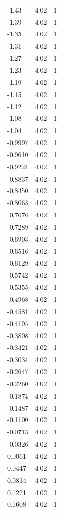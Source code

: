 \begin{longtable}{lrr}
  -1.43 & 4.02 & 1 \\
  -1.39 & 4.02 & 1 \\
  -1.35 & 4.02 & 1 \\
  -1.31 & 4.02 & 1 \\
  -1.27 & 4.02 & 1 \\
  -1.23 & 4.02 & 1 \\
  -1.19 & 4.02 & 1 \\
  -1.15 & 4.02 & 1 \\
  -1.12 & 4.02 & 1 \\
  -1.08 & 4.02 & 1 \\
  -1.04 & 4.02 & 1 \\
  -0.9997 & 4.02 & 1 \\
  -0.9610 & 4.02 & 1 \\
  -0.9224 & 4.02 & 1 \\
  -0.8837 & 4.02 & 1 \\
  -0.8450 & 4.02 & 1 \\
  -0.8063 & 4.02 & 1 \\
  -0.7676 & 4.02 & 1 \\
  -0.7289 & 4.02 & 1 \\
  -0.6903 & 4.02 & 1 \\
  -0.6516 & 4.02 & 1 \\
  -0.6129 & 4.02 & 1 \\
  -0.5742 & 4.02 & 1 \\
  -0.5355 & 4.02 & 1 \\
  -0.4968 & 4.02 & 1 \\
  -0.4581 & 4.02 & 1 \\
  -0.4195 & 4.02 & 1 \\
  -0.3808 & 4.02 & 1 \\
  -0.3421 & 4.02 & 1 \\
  -0.3034 & 4.02 & 1 \\
  -0.2647 & 4.02 & 1 \\
  -0.2260 & 4.02 & 1 \\
  -0.1874 & 4.02 & 1 \\
  -0.1487 & 4.02 & 1 \\
  -0.1100 & 4.02 & 1 \\
  -0.0713 & 4.02 & 1 \\
  -0.0326 & 4.02 & 1 \\
  0.0061 & 4.02 & 1 \\
  0.0447 & 4.02 & 1 \\
  0.0834 & 4.02 & 1 \\
  0.1221 & 4.02 & 1 \\
  0.1608 & 4.02 & 1 \\

\end{longtable}
